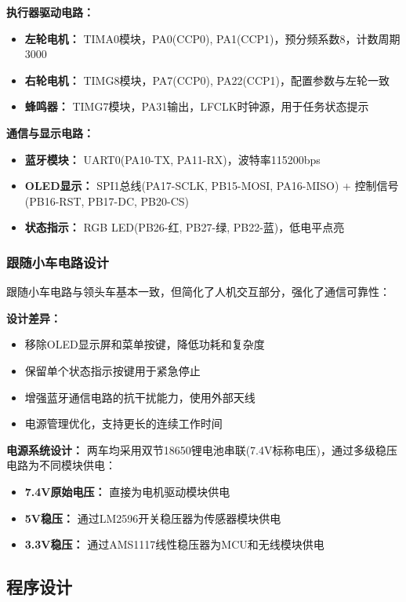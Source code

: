 \documentclass[UTF8]{ctexart}
\begin{document}
\textbf{执行器驱动电路：}
\begin{itemize}
    \item \textbf{左轮电机：} TIMA0模块，PA0(CCP0), PA1(CCP1)，预分频系数8，计数周期3000
    \item \textbf{右轮电机：} TIMG8模块，PA7(CCP0), PA22(CCP1)，配置参数与左轮一致
    \item \textbf{蜂鸣器：} TIMG7模块，PA31输出，LFCLK时钟源，用于任务状态提示
\end{itemize}

\textbf{通信与显示电路：}
\begin{itemize}
    \item \textbf{蓝牙模块：} UART0(PA10-TX, PA11-RX)，波特率115200bps
    \item \textbf{OLED显示：} SPI1总线(PA17-SCLK, PB15-MOSI, PA16-MISO) + 控制信号(PB16-RST, PB17-DC, PB20-CS)
    \item \textbf{状态指示：} RGB LED(PB26-红, PB27-绿, PB22-蓝)，低电平点亮
\end{itemize}

\subsubsection{跟随小车电路设计}

跟随小车电路与领头车基本一致，但简化了人机交互部分，强化了通信可靠性：

\textbf{设计差异：}
\begin{itemize}
    \item 移除OLED显示屏和菜单按键，降低功耗和复杂度
    \item 保留单个状态指示按键用于紧急停止
    \item 增强蓝牙通信电路的抗干扰能力，使用外部天线
    \item 电源管理优化，支持更长的连续工作时间
\end{itemize}

\textbf{电源系统设计：}
两车均采用双节18650锂电池串联(7.4V标称电压)，通过多级稳压电路为不同模块供电：
\begin{itemize}
    \item \textbf{7.4V原始电压：} 直接为电机驱动模块供电
    \item \textbf{5V稳压：} 通过LM2596开关稳压器为传感器模块供电
    \item \textbf{3.3V稳压：} 通过AMS1117线性稳压器为MCU和无线模块供电
\end{itemize}

\subsection{程序设计}
\end{document}
